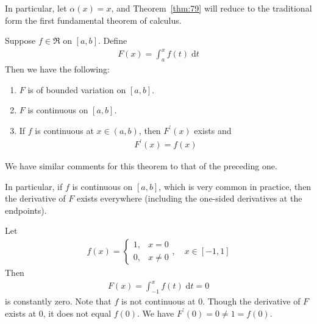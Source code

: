 \documentclass[thmcnt=section, 12pt]{my-elegantbook}
\begin{document}
In particular, let $\alpha(x) = x$, and Theorem~\ref{thm:79}
will reduce to the traditional form the first fundamental
theorem of calculus.

\begin{theorem} \label{thm:81}
    Suppose $f \in \mathfrak{R}$ on $[a, b]$.
    Define
    \begin{align*}
        F(x) = \int_a^x f(t) \; \mathrm{d} t
    \end{align*}
    Then we have the following:
    \begin{enumerate}
        \item $F$ is of bounded variation on $[a, b]$.
        \item $F$ is continuous on $[a, b]$.
        \item If $f$ is continuous at $x \in (a, b)$,
              then $F^\prime(x)$ exists and
              \begin{align*}
                  F^\prime(x) = f(x)
              \end{align*}
    \end{enumerate}
\end{theorem}

\begin{note}
    We have similar comments for this theorem
    to that of the preceding one.

    In particular, if $f$ is continuous on $[a, b]$,
    which is very common in practice,
    then the derivative of $F$ exists everywhere
    (including the one-sided derivatives at the endpoints).
\end{note}

\begin{example} \label{eg:13}
    Let
    \begin{align*}
        f(x) = \begin{cases}
                   1,
                    & x = 0    \\
                   0,
                    & x \neq 0
               \end{cases},
        \quad x \in [-1, 1]
    \end{align*}
    Then
    \begin{align*}
        F(x)
        = \int_{-1}^x f(t) \; \mathrm{d} t
        = 0
    \end{align*}
    is constantly zero.
    Note that $f$ is not continuous at $0$.
    Though the derivative of $F$ exists at $0$,
    it does not equal $f(0)$.
    We have $F^\prime(0) = 0 \neq 1 = f(0)$.
\end{example}
\end{document}
